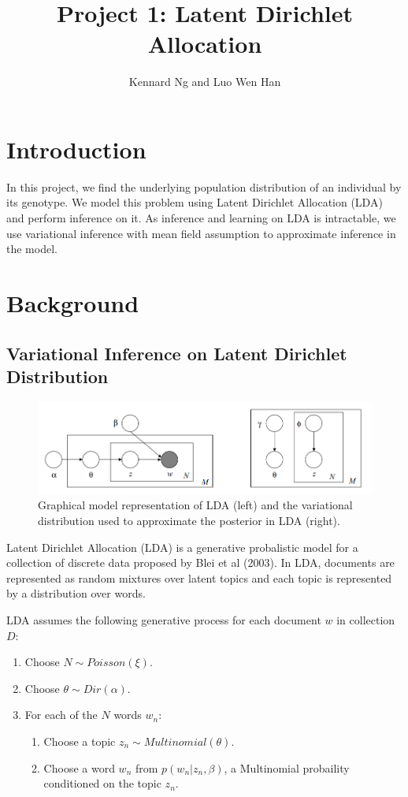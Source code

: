 \documentclass[a4paper]{article}
\author{Kennard Ng and Luo Wen Han}
\title{Project 1: Latent Dirichlet Allocation}
\begin{document}
	\maketitle
	\section{Introduction}
	
	In this project, we find the underlying population distribution of an individual by its genotype.
	We model this problem using Latent Dirichlet Allocation (LDA) and perform inference on it.
	As inference and learning on LDA is intractable, we use variational inference with mean field assumption to approximate inference in the model. 

	\section{Background}
	
	\subsection{Variational Inference on Latent Dirichlet Distribution}
	\begin{figure}[ht]
		\centering
		\includegraphics[width=1.0\linewidth]{images/LDA.png}
		\caption{Graphical model representation of LDA (left) and the variational distribution used to approximate the posterior in LDA (right).}
		\label{fig:lda}
	\end{figure}
	Latent Dirichlet Allocation (LDA) is a generative probalistic model for a collection of discrete data proposed by Blei et al (2003).
	In LDA, documents are represented as random mixtures over latent topics and each topic is represented by a distribution over words.

	LDA assumes the following generative process for each document $w$ in collection $D$:
	\begin{enumerate}
		\item Choose $N\sim Poisson(\xi)$.
		\item Choose $\theta \sim Dir(\alpha)$.
		\item For each of the $N$ words $w_n$:
		\begin{enumerate}
			\item Choose a topic $z_n \sim Multinomial(\theta)$.
			\item Choose a word $w_n$ from $p(w_n|z_n,\beta)$, a Multinomial probaility conditioned on the topic $z_n$.
		\end{enumerate}
	\end{enumerate}
\end{document}
